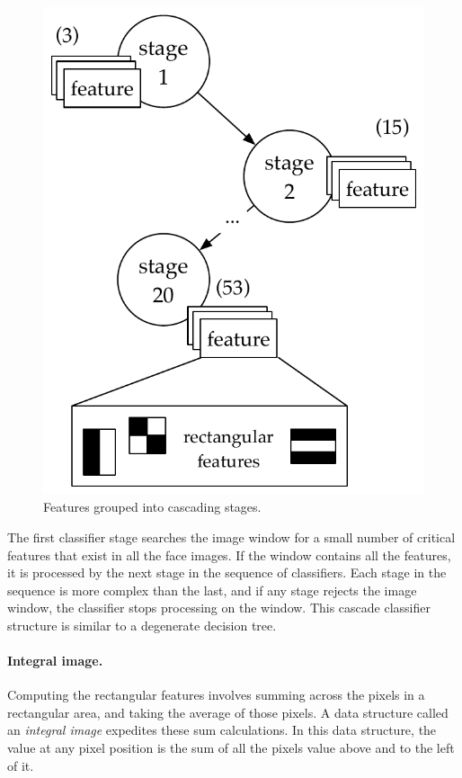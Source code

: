 \begin{figure}
  \includegraphics[width=\textwidth]{nsp-figs/cascade_structure.pdf}
  \caption{Features grouped into cascading stages.}
  \label{fig:vj-cascade}
\end{figure}


The first classifier stage searches the image window for a small number of critical features that exist in all the face images. If the window contains all the features, it is processed by the next stage in the sequence of classifiers. Each stage in the sequence is more complex than the last, and if any stage rejects the image window, the classifier stops processing on the window. This cascade classifier structure is similar to a degenerate decision tree.

\paragraph{Integral image.}Computing the rectangular features involves summing across
the pixels in a rectangular area, and taking the average of those pixels.
A data structure called an \emph{integral image} expedites these sum calculations. In this
data structure, the value at any pixel position is the sum of all the pixels value above and
to the left of it.

